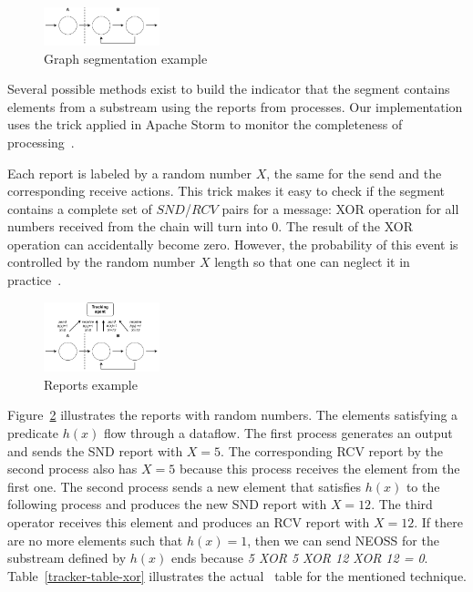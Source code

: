 \begin{figure}[t]
  \centering
  \includegraphics[width=0.3\textwidth]{pics/segments-example.pdf}
  \caption{Graph segmentation example}
  \label{fig:tracker-acker-comparison}
\end{figure}

Several possible methods exist to build the indicator that the segment contains elements from a substream using the reports from processes. Our implementation uses the trick applied in Apache Storm to monitor the completeness of processing~\cite{apache:storm:acker}. 

Each report is labeled by a random number $X$, the same for the send and the corresponding receive actions. This trick makes it easy to check if the segment contains a complete set of $SND$/$RCV$ pairs for a message: XOR operation for all numbers received from the chain will turn into 0. The result of the XOR operation can accidentally become zero. However, the probability of this event is controlled by the random number $X$ length so that one can neglect it in practice~\cite{apache:storm:acker}.

\begin{figure}[t]
  \centering
  \includegraphics[width=0.3\textwidth]{pics/tracker-segments-example.pdf}
  \caption{Reports example}
  \label{fig:tracker-reports}
\end{figure}

Figure~\ref{fig:tracker-reports} illustrates the reports with random numbers. The elements satisfying a predicate $h(x)$ flow through a dataflow. The first process generates an output and sends the SND report with $X=5$. The corresponding RCV report by the second process also has $X=5$ because this process receives the element from the first one. The second process sends a new element that satisfies $h(x)$ to the following process and produces the new SND report with $X=12$. The third operator receives this element and produces an RCV report with $X=12$. If there are no more elements such that $h(x)=1$, then we can send NEOSS for the substream defined by $h(x)$ ends because {\em 5 XOR 5 XOR 12 XOR 12 = 0}. Table~\ref{tracker-table-xor} illustrates the actual \tracker\ table for the mentioned technique.

